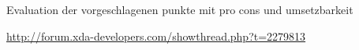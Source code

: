 Evaluation der vorgeschlagenen punkte mit pro cons und umsetzbarkeit\newline

\url{http://forum.xda-developers.com/showthread.php?t=2279813}\newline
